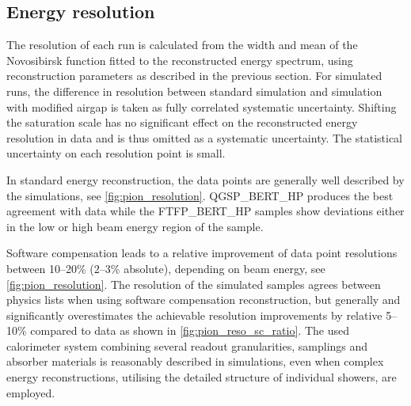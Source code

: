 \documentclass[twoside,a4paper,12pt]{article}
\begin{document}
\subsection{Energy resolution}
The resolution of each run is calculated from the width and mean of the Novosibirsk function fitted to the reconstructed energy spectrum, using reconstruction parameters as described in the previous section. For simulated runs, the difference in resolution between standard simulation and simulation with modified airgap is taken as fully correlated systematic uncertainty. Shifting the saturation scale has no significant effect on the reconstructed energy resolution in data and is thus omitted as a systematic uncertainty. The statistical uncertainty on each resolution point is small.

In standard energy reconstruction, the data points are generally well described by the simulations, see \autoref{fig:pion_resolution}. QGSP\_BERT\_HP produces the best agreement with data while the FTFP\_BERT\_HP samples show deviations either in the low or high beam energy region of the sample.

Software compensation leads to a relative improvement of data point resolutions between 10--20\% (2--3\% absolute), depending on beam energy, see \autoref{fig:pion_resolution}.
The resolution of the simulated samples agrees between physics lists when using software compensation reconstruction, but generally and significantly overestimates the achievable resolution improvements by relative 5--10\% compared to data as shown in \autoref{fig:pion_reso_sc_ratio}. The used calorimeter system combining several readout granularities, samplings and absorber materials is reasonably described in simulations, even when complex energy reconstructions, utilising the detailed structure of individual showers, are employed. 
\end{document}
